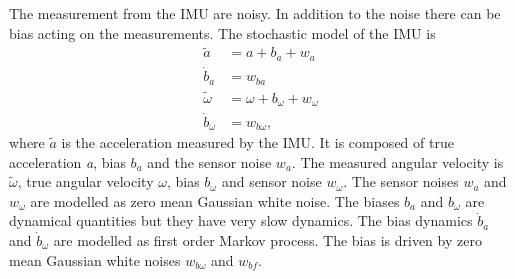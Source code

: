 The measurement from the IMU are noisy. In addition to the noise there can be bias acting on the measurements. The stochastic model of the IMU is 
\begin{equation}
\label{eq:imu_noise}
\begin{split}
\tilde{a} &= a + b_a + w_a \\
\dot{b}_a &= w_{ba} \\
\tilde{\omega} &= \omega + b_\omega + w_\omega \\
\dot{b}_\omega &= w_{b\omega},
\end{split}
\end{equation}
where $\tilde{a}$ is the acceleration measured by the IMU. It is composed of true acceleration \emph{a}, bias $b_a$ and the sensor noise $w_a$. The measured angular velocity is $\tilde{\omega}$, true angular velocity $\omega$, bias $b_{\omega}$ and sensor noise $w_\omega$. The sensor noises $w_a$ and $w_\omega$ are modelled as zero mean Gaussian white noise. The biases $b_a$ and $b_\omega$ are dynamical quantities but they have very slow dynamics. The bias dynamics $\dot{b}_a$ and $\dot{b}_\omega$ are modelled as first order Markov process. The bias is driven by zero mean Gaussian white noises $w_{b\omega}$ and $w_{bf}$.

